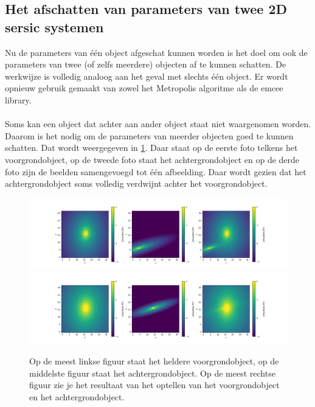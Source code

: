 \subsection{Het afschatten van parameters van twee 2D sersic systemen}
Nu de parameters van één object afgeschat kunnen worden is het doel om ook de parameters van twee (of zelfs meerdere) objecten af te kunnen schatten. De werkwijze is volledig analoog aan het geval met slechts één object. Er wordt opnieuw gebruik gemaakt van zowel het Metropolis algoritme als de emcee library. \\ \\
Soms kan een object dat achter aan ander object staat niet waargenomen worden. Daarom is het nodig om de parameters van meerder objecten goed te kunnen schatten. Dat wordt weergegeven in \cref{fig:2_sersic}. Daar staat op de eerste foto telkens het voorgrondobject, op de tweede foto staat het achtergrondobject en op de derde foto zijn de beelden samengevoegd tot één afbeelding. Daar wordt  gezien dat het achtergrondobject soms volledig verdwijnt achter het voorgrondobject.
\begin{figure}
    \begin{minipage}{0.98\linewidth}
    \includegraphics[width=0.95\linewidth]{Sections/figuur_2D_zonder_package_3_8_8_0.3_1.5.png}
    \includegraphics[width=0.95\linewidth]{Sections/figuur_2D_zonder_package_10_8_8_0.3_1.5.png}
    \end{minipage}
    \caption{Op de meest linkse figuur staat het heldere voorgrondobject, op de middelste figuur staat het achtergrondobject. Op de meest rechtse figuur zie je het resultaat van het optellen van het voorgrondobject en het achtergrondobject.}
    \label{fig:2_sersic}
\end{figure}
